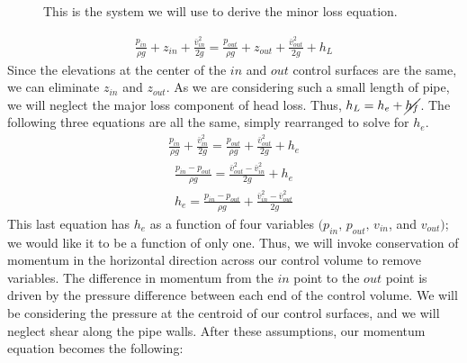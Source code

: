 \documentclass[letterpaper,10pt,english]{sphinxmanual}
\let\sphinxpxdimen\pdfpxdimen\else\newdimen\sphinxpxdimen
\begin{document}
\begin{figure}[htbp]
\centering
\capstart

\noindent\sphinxincludegraphics[width=700\sphinxpxdimen]{{minor_loss_pipe}.png}
\caption{This is the system we will use to derive the minor loss equation.}\label{\detokenize{Review/Review_Fluid_Mechanics_Derivations:id1}}\label{\detokenize{Review/Review_Fluid_Mechanics_Derivations:figure-minor-loss-pipe}}\end{figure}
\begin{equation}\label{equation:Review/Review_Fluid_Mechanics_Derivations:Review/Review_Fluid_Mechanics_Derivations:0}
\begin{split}\frac{p_{in}}{\rho g} + {z_{in}} + \frac{\bar v_{in}^2}{2g} = \frac{p_{out}}{\rho g} + z_{out} + \frac{\bar v_{out}^2}{2g} + h_L\end{split}
\end{equation}
Since the elevations at the center of the \(in\) and \(out\) control surfaces are the same, we can eliminate \(z_{in}\) and \(z_{out}\). As we are considering such a small length of pipe, we will neglect the major loss component of head loss. Thus, \(h_L = h_e + \cancel{h_f}\). The following three equations are all the same, simply rearranged to solve for \(h_e\).
\begin{equation}\label{equation:Review/Review_Fluid_Mechanics_Derivations:Review/Review_Fluid_Mechanics_Derivations:1}
\begin{split}\frac{p_{in}}{\rho g} + \frac{\bar v_{in}^2}{2g} = \frac{p_{out}}{\rho g} + \frac{\bar v_{out}^2}{2g} + h_e\end{split}
\end{equation}\begin{equation}\label{equation:Review/Review_Fluid_Mechanics_Derivations:Review/Review_Fluid_Mechanics_Derivations:2}
\begin{split}\frac{p_{in} - p_{out}}{\rho g} = \frac{\bar v_{out}^2 - \bar v_{in}^2}{2g} + h_e\end{split}
\end{equation}\begin{equation}\label{equation:Review/Review_Fluid_Mechanics_Derivations:minor_loss_energy_eq}
\begin{split}  h_e = \frac{p_{in} - p_{out}}{\rho g} + \frac{\bar v_{in}^2 - \bar v_{out}^2}{2g}\end{split}
\end{equation}
This last equation has \(h_e\) as a function of four variables \((p_{in}, \, p_{out}, \, v_{in}\), and \(v_{out})\); we would like it to be a function of only one. Thus, we will invoke conservation of momentum in the horizontal direction across our control volume to remove variables. The difference in momentum from the \(in\) point to the \(out\) point is driven by the pressure difference between each end of the control volume. We will be considering the pressure at the centroid of our control surfaces, and we will neglect shear along the pipe walls. After these assumptions, our momentum equation becomes the following:
\end{document}
